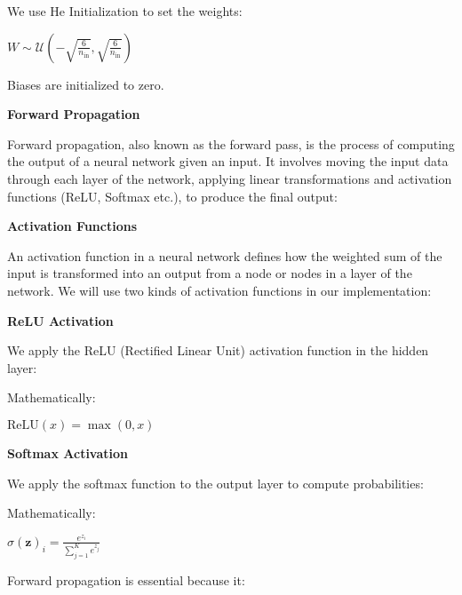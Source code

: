 We use He Initialization to set the weights:

\vspace{3mm}
{\huge $W \sim \mathcal{U}\left(-\sqrt{\frac{6}{n_{\text{in}}}}, \sqrt{\frac{6}{n_{\text{in}}}}\right)$}
\vspace{3mm}

Biases are initialized to zero.

\vspace{5mm}
{\noindent\huge\bf Forward Propagation}
\vspace{5mm}

Forward propagation, also known as the forward pass, is the process of
computing the output of a neural network given an input. It involves moving the
input data through each layer of the network, applying linear transformations
and activation functions (ReLU, Softmax etc.), to produce the final output:

\vspace{5mm}
{\noindent\huge\bf Activation Functions}
\vspace{5mm}

An activation function in a neural network defines how the weighted sum of the
input is transformed into an output from a node or nodes in a layer of the
network. We will use two kinds of activation functions in our implementation:

\vspace{3mm}
{\Large\bf ReLU Activation}
\vspace{3mm}

We apply the ReLU (Rectified Linear Unit) activation function in the hidden
layer:

Mathematically:

\vspace{3mm}
{\huge $\text{ReLU}(x) = \max(0, x)$}
\vspace{3mm}

\vspace{3mm}
{\Large\bf Softmax Activation}
\vspace{3mm}

We apply the softmax function to the output layer to compute probabilities:

Mathematically: 

\vspace{3mm}
{\huge $\sigma(\mathbf{z})_i = \frac{e^{z_i}}{\sum_{j=1}^{K} e^{z_j}}$}
\vspace{3mm}

Forward propagation is essential because it:

